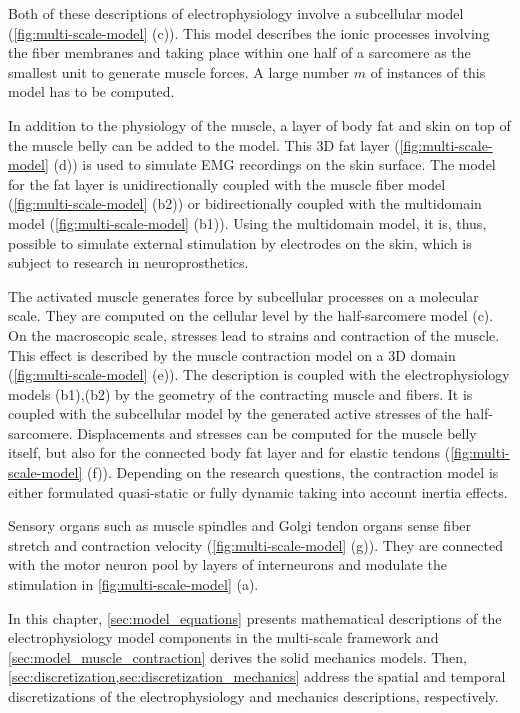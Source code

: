 Both of these descriptions of electrophysiology involve a subcellular model (\cref{fig:multi-scale-model} (c)). This model describes the ionic processes involving the fiber membranes and taking place within one half of a sarcomere as the smallest unit to generate muscle forces. A large number $m$ of instances of this model has to be computed. 

In addition to the physiology of the muscle, a layer of body fat and skin on top of the muscle belly can be added to the model. This 3D fat layer (\cref{fig:multi-scale-model} (d)) is used to simulate EMG recordings on the skin surface. The model for the fat layer is unidirectionally coupled with the muscle fiber model (\cref{fig:multi-scale-model} (b2)) or bidirectionally coupled with the multidomain model (\cref{fig:multi-scale-model} (b1)). Using the multidomain model, it is, thus, possible to simulate external stimulation by electrodes on the skin, which is subject to research in neuroprosthetics.

The activated muscle generates force by subcellular processes on a molecular scale. They are computed on the cellular level by the half-sarcomere model (c). On the macroscopic scale, stresses lead to strains and contraction of the muscle. This effect is described by the muscle contraction model on a 3D domain (\cref{fig:multi-scale-model} (e)). 
The description is coupled with the electrophysiology models (b1),(b2) by the geometry of the contracting muscle and fibers. It is coupled with the subcellular model by the generated active stresses of the half-sarcomere. Displacements and stresses can be computed for the muscle belly itself, but also for the connected body fat layer and for elastic tendons (\cref{fig:multi-scale-model} (f)). Depending on the research questions, the contraction model is either formulated quasi-static or fully dynamic taking into account inertia effects.

Sensory organs such as muscle spindles and Golgi tendon organs sense fiber stretch and contraction velocity (\cref{fig:multi-scale-model} (g)). They are connected with the motor neuron pool by layers of interneurons and modulate the stimulation in \cref{fig:multi-scale-model} (a).

In this chapter, \cref{sec:model_equations} presents mathematical descriptions of the electrophysiology model components in the multi-scale framework and \cref{sec:model_muscle_contraction} derives the solid mechanics models. Then, \cref{sec:discretization,sec:discretization_mechanics} address the spatial and temporal discretizations of the electrophysiology and mechanics descriptions, respectively.

